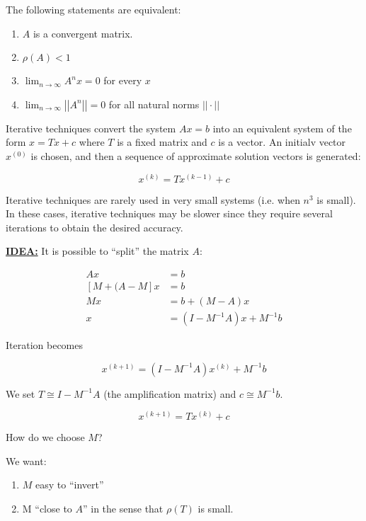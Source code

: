 \thm The following statements are equivalent:

\begin{enumerate}
  \item $A$ is a convergent matrix.
  \item $\rho(A) < 1$
  \item $\lim_{n\to\infty} A^n x = 0$ for every $x$
  \item $\lim_{n\to\infty} \left|\left|A^n\right|\right| = 0$ for all natural
    norms $||\cdot||$
\end{enumerate}

Iterative techniques convert the system $Ax=b$ into an equivalent system of
the form $x=Tx+c$ where $T$ is a fixed matrix and $c$ is a vector. An initialv
vector $x^{(0)}$ is chosen, and then a sequence of approximate solution vectors
is generated:

\begin{equation*}
  x^{(k)} = Tx^{(k-1)} + c
\end{equation*}

Iterative techniques are rarely used in very small systems 
(i.e. when $n^3$ is small). In these cases, iterative techniques may be slower 
since they require several iterations to obtain the desired accuracy.

\uline{\textbf{IDEA:}} It is possible to \enquote{split} the matrix $A:$

\begin{align*}
  Ax&=b \\
  \left[M+(A-M\right]x &= b \\
  Mx &= b+(M-A)x \\ 
  x &= (I-M^{-1}A)x + M^{-1}b 
\end{align*}

Iteration becomes 

\begin{equation*}
  x^{(k+1)} = (I-M^{-1}A)x^{(k)} + M^{-1}b
\end{equation*}

We set $T\cong I-M^{-1}A$ (the amplification matrix) and $c\cong M^{-1}b$.

\begin{equation*}
  x^{(k+1)} = Tx^{(k)} + c
\end{equation*}

How do we choose $M$?

We want:

\begin{enumerate}
\item $M$ easy to \enquote{invert}
\item M \enquote{close to $A$} in the sense that $\rho(T)$ is small.
\end{enumerate}

